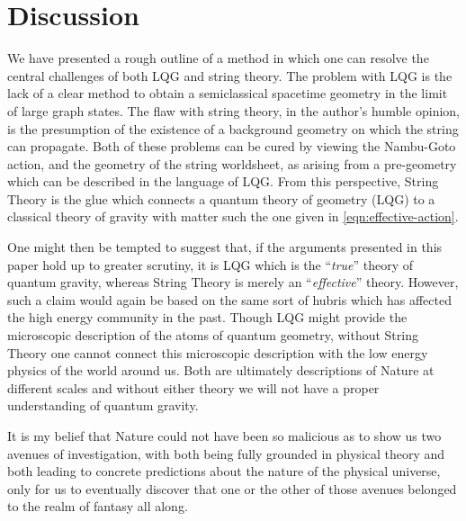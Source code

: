 \documentclass[a4paper]{article}
\begin{document}
\section{Discussion}\label{sec:discussion}

We have presented a rough outline of a method in which one can resolve the central challenges of both LQG and string theory. The problem with LQG is the lack of a clear method to obtain a semiclassical spacetime geometry in the limit of large graph states. The flaw with string theory, in the author's humble opinion, is the presumption of the existence of a background geometry on which the string can propagate. Both of these problems can be cured by viewing the Nambu-Goto action, and the geometry of the string worldsheet, as arising from a pre-geometry which can be described in the language of LQG. From this perspective, String Theory is the glue which connects a quantum theory of geometry (LQG) to a classical theory of gravity with matter such the one given in \eqref{eqn:effective-action}.

One might then be tempted to suggest that, if the arguments presented in this paper hold up to greater scrutiny, it is LQG which is the ``\emph{true}'' theory of quantum gravity, whereas String Theory is merely an ``\emph{effective}'' theory. However, such a claim would again be based on the same sort of hubris which has affected the high energy community in the past. Though LQG might provide the microscopic description of the atoms of quantum geometry, without String Theory one cannot connect this microscopic description with the low energy physics of the world around us. Both are ultimately descriptions of Nature at different scales and without either theory we will not have a proper understanding of quantum gravity.


It is my belief that Nature could not have been so malicious as to show us two avenues of investigation, with both being fully grounded in physical theory and both leading to concrete predictions about the nature of the physical universe, only for us to eventually discover that one or the other of those avenues belonged to the realm of fantasy all along.
\end{document}
